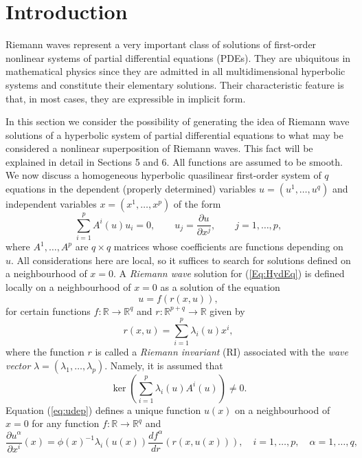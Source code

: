 \documentclass{birkjour}
\theoremstyle{definition}
\theoremstyle{remark}
\numberwithin{equation}{section}
\numberwithin{equation}{section}
\numberwithin{thm}{section}
\numberwithin{equation}{section}
\numberwithin{thm}{section}
\begin{document}
\section{Introduction}\label{Introduction}\setcounter{equation}{0}

Riemann waves represent a very important class of solutions of first-order nonlinear systems of partial differential equations (PDEs). They are ubiquitous in  mathematical physics since they are admitted in all multidimensional hyperbolic systems and constitute their elementary solutions. Their characteristic feature is that, in most cases, they are expressible in implicit form. 

In this section we consider the possibility of generating the idea of Riemann wave solutions of a hyperbolic system of partial differential equations to what may be considered a nonlinear superposition of Riemann waves. This fact will be explained in detail in Sections 5 and 6.  All functions are assumed to be smooth. We now discuss a homogeneous hyperbolic quasilinear first-order system   of $q$ equations in the  dependent (properly determined) variables $u=(u^1,\ldots,u^q)$ and  independent variables $x=(x^1,\ldots,x^p)$ of the form
\begin{equation}
	\label{Eq:HydEq}
	\sum_{i=1}^pA^i(u)u_i=0, \qquad u_j=\frac{\partial u}{\partial x^j},\qquad j=1,\ldots,p,
\end{equation}
where $A^1,\ldots,A^p$ are $q\times q$ matrices whose coefficients are  functions depending on $u$. All considerations here are local, so it suffices to search for solutions defined on a neighbourhood of $x=0$. A {\it Riemann wave} solution for (\ref{Eq:HydEq}) is defined locally on a neighbourhood of $x=0$ as a solution of the equation
\begin{equation}
	\label{eq:udep}
	u=f(r(x,u)),
\end{equation}
for certain functions $f:\mathbb{R}\rightarrow \mathbb{R}^q$ and  $r:\mathbb{R}^{p+q}\rightarrow \mathbb{R}$ given by
$$ 
r(x,u)=\sum_{i=1}^p\lambda_i(u)x^i,
$$
where the function $r$ is called a {\it Riemann invariant} (RI) associated with the {\it wave vector}  $\lambda=(\lambda_1,\ldots,\lambda_p)$. Namely, it is assumed that
$$
\ker\left(\sum_{i=1}^p\lambda_i(u)A^i(u)\right)\neq 0.
$$
Equation (\ref{eq:udep}) defines a unique function $u(x)$ on a neighbourhood of $x=0$ for any function $f:\mathbb{R}\rightarrow \mathbb{R}^q$ and
$$
\frac{\partial u^\alpha}{\partial x^i}(x)=\phi(x)^{-1}\lambda_i(u(x))\frac{df^{\alpha}}{dr}(r(x,u(x))),\quad i=1,\ldots,p,\quad \alpha=1,\ldots,q,
$$
\end{document}
